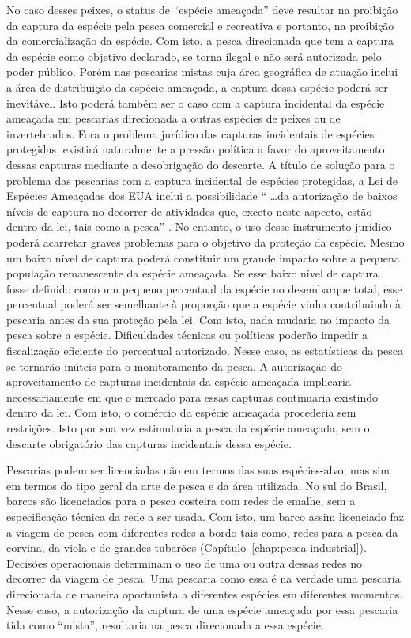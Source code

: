 \documentclass[a4paper,11pt,twoside,showtrims,onecolumn,openright,final]{memoir}
\begin{document}
No caso desses peixes, o status de  ``espécie ameaçada'' deve resultar na proibição da captura da 
espécie pela pesca comercial e recreativa e portanto, na proibição da comercialização da espécie. 
Com isto, a pesca direcionada que tem a captura da espécie como objetivo declarado, se torna ilegal 
e não será autorizada pelo poder público. Porém nas pescarias mistas cuja área geográfica de atuação 
inclui a área de distribuição da espécie ameaçada, a captura dessa espécie poderá ser inevitável. 
Isto poderá também ser o caso com a captura incidental da espécie ameaçada em pescarias direcionada a 
outras espécies de peixes ou de invertebrados. Fora o problema jurídico das capturas incidentais de 
espécies protegidas, existirá naturalmente a pressão política a favor do aproveitamento dessas capturas 
mediante a desobrigação do descarte. A título de solução para o problema das pescarias com a captura 
incidental de espécies protegidas,  a Lei de Espécies Ameaçadas dos EUA inclui a possibilidade  
`` \ldots da autorização de baixos níveis de captura no decorrer de atividades que, exceto neste aspecto, 
estão dentro da lei, tais como a pesca'' \citep[tradução dos autores]{daves1998}. %
No entanto, o uso desse instrumento jurídico poderá acarretar graves problemas para o objetivo da 
proteção da espécie. Mesmo um baixo nível de captura poderá constituir um grande impacto sobre a pequena 
população remanescente da espécie ameaçada. Se esse baixo nível de captura fosse definido como um pequeno 
percentual da espécie no desembarque total, esse percentual poderá ser semelhante à proporção que 
a espécie vinha contribuindo à pescaria antes da sua proteção pela 
lei. Com isto, nada mudaria no impacto da pesca sobre a espécie. 
Dificuldades técnicas ou políticas poderão impedir  a fiscalização eficiente do percentual autorizado. 
Nesse caso, as estatísticas da pesca se tornarão inúteis para o monitoramento da pesca. A autorização 
do aproveitamento de capturas incidentais da espécie ameaçada implicaria necessariamente em que o mercado 
para essas capturas continuaria existindo dentro da lei. Com isto, o comércio da espécie ameaçada procederia 
sem restrições. Isto por sua vez estimularia a pesca da espécie ameaçada, sem o descarte  
obrigatório das capturas incidentais dessa espécie.

Pescarias podem ser licenciadas não em termos das suas espécies-alvo, mas sim em termos do tipo geral 
da arte de pesca e da área utilizada. No sul do Brasil, barcos são licenciados para a 
pesca costeira com redes de emalhe, sem a especificação técnica da rede a ser usada. Com isto, um barco 
assim licenciado faz a viagem de pesca com diferentes redes a bordo tais como, redes para 
a pesca da corvina, da viola e de grandes tubarões (Capítulo~\ref{chap:pesca-industrial}). %
Decisões operacionais determinam o uso de uma ou outra dessas 
redes no decorrer da viagem de pesca. 
Uma pescaria como essa é na verdade uma pescaria direcionada de maneira oportunista a diferentes espécies 
em diferentes momentos. Nesse caso, a autorização da captura de uma espécie ameaçada por essa pescaria 
tida como ``mista'', resultaria na pesca direcionada a essa espécie.
\end{document}

